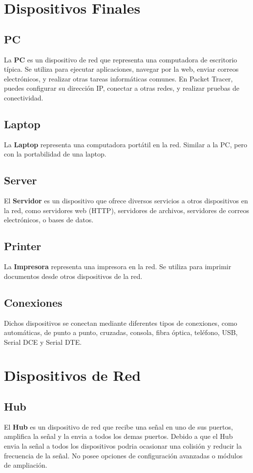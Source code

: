 \documentclass[]{article}
\begin{document}
\section{Dispositivos Finales}
\subsection{PC}
La \textbf{PC} es un dispositivo de red que representa una computadora de escritorio típica. Se utiliza para ejecutar aplicaciones, navegar por la web, enviar correos electrónicos, y realizar otras tareas informáticas comunes. En Packet Tracer, puedes configurar su dirección IP, conectar a otras redes, y realizar pruebas de conectividad.

\subsection{Laptop}
La \textbf{Laptop} representa una computadora portátil en la red. Similar a la PC, pero con la portabilidad de una laptop.

\subsection{Server}
El \textbf{Servidor} es un dispositivo que ofrece diversos servicios a otros dispositivos en la red, como servidores web (HTTP), servidores de archivos, servidores de correos electrónicos, o bases de datos.

\subsection{Printer}
La \textbf{Impresora} representa una impresora en la red. Se utiliza para imprimir documentos desde otros dispositivos de la red.

\subsection{Conexiones}
Dichos dispositivos se conectan mediante diferentes tipos de conexiones, como automáticas, de punto a punto, cruzadas, consola, fibra óptica, teléfono, USB, Serial DCE y Serial DTE.

\section{Dispositivos de Red}
	\subsection{Hub}
	El \textbf{Hub} es un dispositivo de red que recibe una señal en uno de sus puertos, amplifica la señal y la envia a todos los demas puertos. Debido a que el Hub envia la señal a todos los dispositivos podria ocasionar una colisión y reducir la frecuencia de la señal. No posee opciones de configuración avanzadas o módulos de ampliación.
\end{document}
